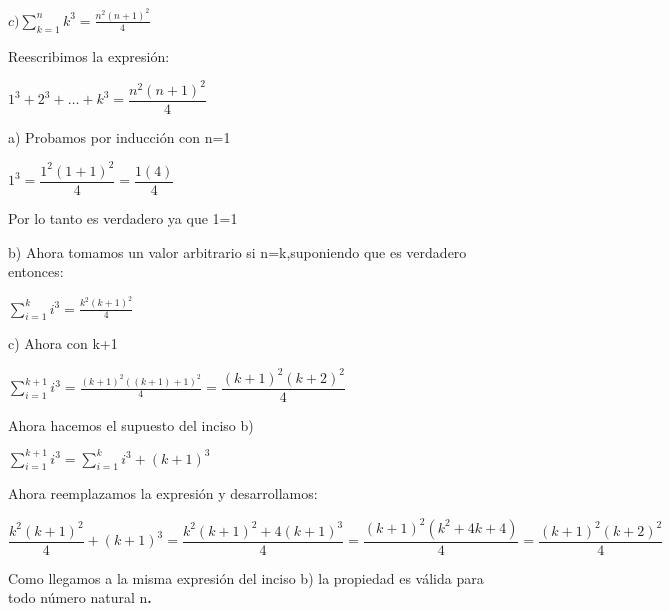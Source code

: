 \documentclass[12pt,a4paper,scrartcl]{article}
\begin{document}
{\newpage
\begin{flushleft}
$\displaystyle
c) \sum_{k=1}^{n}k^{3} = \frac{n^2(n+1)^2}{4}$\\
\end{flushleft}
\begin{flushleft}
Reescribimos la expresi\'on:\\
\end{flushleft}
\begin{center}
$1^3+2^3+\ldots+k^3=\dfrac{n^{2}(n+1)^2}{4}$\\
\end{center}
\begin{flushleft}
a) Probamos por inducci\'on con n=1\\
\end{flushleft}
\begin{center}
$1^3=\dfrac{1^{2}(1+1)^2}{4} = \dfrac{1(4)}{4}$\\
\end{center}
\begin{flushleft}
Por lo tanto es verdadero ya que 1=1\\\vspace{1em}
\end{flushleft}
\begin{flushleft}
b) Ahora tomamos un valor arbitrario si n=k,suponiendo que es verdadero entonces:\\
\end{flushleft}
\begin{center}
$\displaystyle
\sum_{i=1}^{k}i^{3} = \frac{k^2(k+1)^2}{4}$\\
\end{center}

c) Ahora con k+1
\begin{center}
$\displaystyle
\sum_{i=1}^{k+1}i^{3} = \frac{(k+1)^2((k+1)+1)^2}{4} = \dfrac{(k+1)^2(k+2)^2}{4}$\\
\end{center}
\begin{flushleft}
Ahora hacemos el supuesto del inciso b)\\
\end{flushleft}

$\displaystyle
\sum_{i=1}^{k+1}i^{3} = \sum_{i=1}^{k}i^{3} + (k+1)^3$\\
\begin{flushleft}
Ahora reemplazamos la expresi\'on y desarrollamos:
\end{flushleft}
$\dfrac{k^2(k+1)^2}{4}+(k+1)^3 = \dfrac{k^2(k+1)^2+4(k+1)^3}{4}
=\dfrac{(k+1)^2(k^2+4k+4)}{4}=\dfrac{(k+1)^2(k+2)^2}{4}$\\\vspace{1em}
\begin{flushleft}
Como llegamos a la misma expresi\'on del inciso b) la propiedad es v\'alida para todo n\'umero natural n\textbf{.}
\end{flushleft}

}
\end{document}
